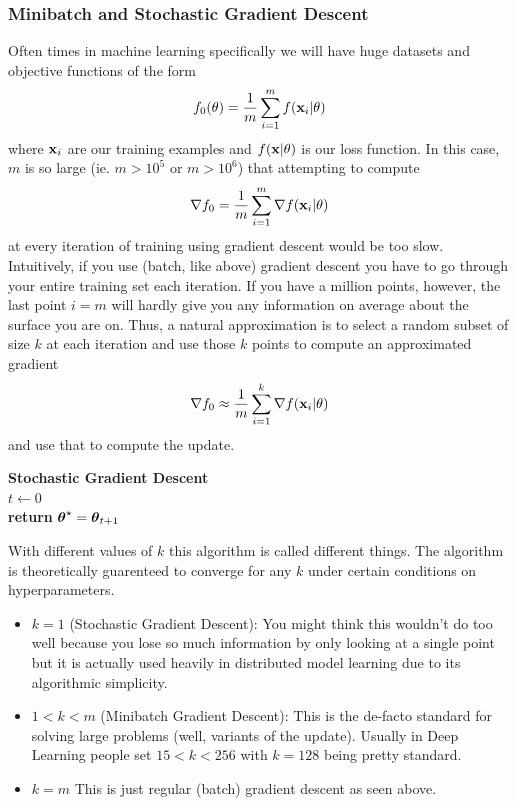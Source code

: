 \documentclass{article}
\begin{document}
\subsubsection{Minibatch and Stochastic Gradient Descent}

Often times in machine learning specifically we will have huge datasets
and objective functions of the form
\[
    f_0(\theta) = \frac{1}{m}\sum_{i=1}^m f({\bf x}_i | \theta)
\]
where ${\bf x}_i$ are our training examples and $f({\bf x}|\theta)$ is our loss function.
In this case, $m$ is so large (ie. $m > 10^5$ or $m > 10^6$) that attempting to compute
\[
    \nabla f_0 = \frac{1}{m}\sum_{i=1}^m \nabla f({\bf x}_i | \theta)
\]
at every iteration of training using gradient descent would be too slow. Intuitively,
if you use (batch, like above) gradient descent you have to go through your
entire training set each iteration. If you have a million points, however,
the last point $i=m$ will hardly give you any information on average about the surface
you are on. Thus, a natural approximation is to select a random subset of size
$k$ at each iteration and use those $k$ points to compute an approximated gradient
\[
    \nabla f_0 \approx \frac{1}{m}\sum_{i=1}^k \nabla f({\bf x}_i | \theta)
\]
and use that to compute the update. 

\IncMargin{1em}
\begin{algorithm}
    \textbf{Stochastic Gradient Descent}\\
    $t \leftarrow 0$\\
    \textbf{return } $\hbox{\boldmath$\theta$}^\star = \hbox{\boldmath$\theta$}_{t+1}$
\end{algorithm}

With different values of $k$ this algorithm is called different things. The algorithm
is theoretically guarenteed to converge for any $k$ under certain conditions on hyperparameters.
\begin{itemize}
    \item $k=1$ (Stochastic Gradient Descent): You might think this wouldn't
        do too well because you lose so much information by only looking at a
        single point but it is actually used heavily in distributed model learning
        due to its algorithmic simplicity.
    \item $1 < k < m$ (Minibatch Gradient Descent): This is the de-facto standard
        for solving large problems (well, variants of the update). Usually in Deep
        Learning people set $15 < k < 256$ with $k=128$ being pretty standard.
    \item $k=m$ This is just regular (batch) gradient descent as seen above.
\end{itemize}
\end{document}
